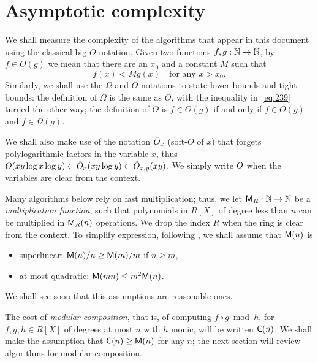 \section{Asymptotic complexity}
\label{sec:asympt-compl}
We shall measure the complexity of the algorithms that appear in this
document using the classical  big $O$ notation. Given two
functions $f,g:\mathbb{N}\rightarrow\mathbb{N}$, by $f\in O(g)$ we mean that there are an
$x_0$ and a constant $M$ such that
\begin{equation}
  \label{eq:239}
  f(x)<Mg(x) \quad\text{for any $x>x_0$.}  
\end{equation}
Similarly, we shall use the $\Omega$ and $\Theta$ notations to state
lower bounds and tight bounds: the definition of $\Omega$ is the same
as $O$, with the inequality in~\eqref{eq:239} turned the other way;
the definition of $\Theta$ is $f\in\Theta(g)$ if and only if $f\in
O(g)$ and $f\in\Omega(g)$.

We shall also make use of the notation $\tilde{O}_x$
(soft-$O$ of $x$) that forgets polylogarithmic factors
in the variable $x$, thus $O(xy\log x \log y)\subset\tilde{O}_x(xy\log
y)\subset\tilde{O}_{x,y}(xy)$. We simply write $\tilde{O}$ when the
variables are clear from the context.

Many algorithms below rely on fast multiplication; thus, we let
$\mathsf{M}_R : \mathbb{N} \rightarrow \mathbb{N}$ be a
\textit{multiplication
  function},
such that polynomials in $R[X]$ of degree less than $n$ can be
multiplied in $\mathsf{M}_R(n)$ operations. We drop the index $R$ when the
ring is clear from the context. To simplify expression, following
\cite[$\S$8.3]{vzGG}, we shall assume that $\mathsf{M}(n)$ is
\begin{itemize}
\item superlinear: $\mathsf{M}(n)/n \ge \mathsf{M}(m)/m$ if $n\ge m$,
\item at most quadratic: $\mathsf{M}(mn)\le m^2\mathsf{M}(n)$.
\end{itemize}
We shall see soon that this assumptions are reasonable ones.

The cost of \emph{modular composition},
that is, of computing $f\circ g \bmod h$, for $f,g,h\in R[X]$ of
degrees at most $n$ with $h$ monic, will be written
$\mathsf{C}(n)$. We shall make the assumption that
$\mathsf{C}(n)\ge\mathsf{M}(n)$ for any $n$; the next section will review
algorithms for modular composition.


